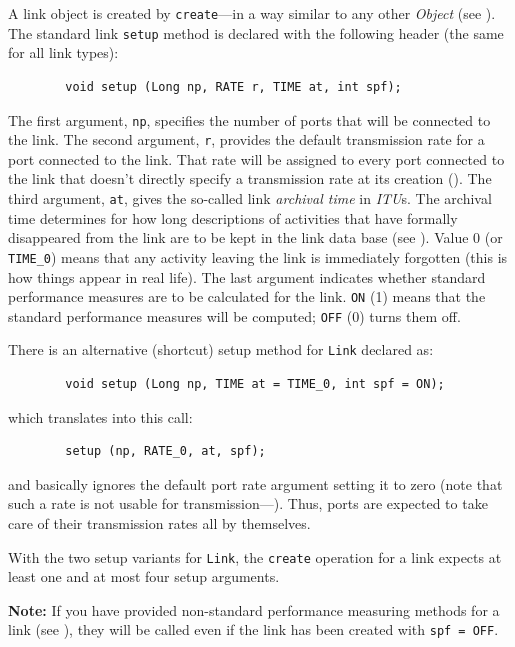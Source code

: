 A link object is created by {\tt create}---in a way similar to
any other {\em Object\/} (see ).
The standard link {\tt setup} method is declared with the following header
(the same for all link types):
\begin{verbatim}
        void setup (Long np, RATE r, TIME at, int spf);
\end{verbatim}
The first argument, {\tt np}, specifies the number
of ports that will be connected to the link.
The second argument, {\tt r}, provides the default transmission rate for a
port connected to the link.
That rate will be assigned to every port connected to the link that doesn't
directly specify a transmission rate at its creation ().
The third argument, {\tt at}, gives the so-called link {\em archival time\/}
in {\em ITU\/}s.
The archival time determines for how long descriptions of activities that
have formally disappeared from the link are to be kept in the link
data base (see ).
Value 0 (or {\tt TIME\_0}) means that any activity leaving the link is
immediately
forgotten (this is how things appear in real life).
The last argument indicates whether standard performance measures
are to be calculated for the link.
{\tt ON} (1) means that the standard performance measures will be
computed; {\tt OFF} (0) turns them off.

There is an alternative (shortcut) setup method for {\tt Link} declared as:
\begin{verbatim}
        void setup (Long np, TIME at = TIME_0, int spf = ON);
\end{verbatim}
\noindent
which translates into this call:
\begin{verbatim}
        setup (np, RATE_0, at, spf);
\end{verbatim}
\noindent
and basically ignores the default port rate argument setting it to zero (note that such a rate is not usable for transmission---).
Thus, ports are expected to take care of their transmission
rates all by themselves. 

With the two setup variants for {\tt Link}, the {\tt create} operation for a link expects at least one and at most four setup arguments.

\medskip

\noindent
{\bf Note:} If you have provided non-standard performance measuring
methods for a link (see ), they will be called even if
the link has been created with {\tt spf = OFF}.

\medskip

